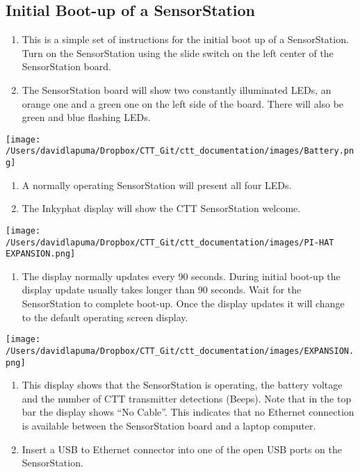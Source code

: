 \documentclass[
]{article}
\providecommand{\tightlist}{%
  \setlength{\itemsep}{0pt}\setlength{\parskip}{0pt}}
\begin{document}
\hypertarget{initial-boot-up-of-a-sensorstation-1}{%
\subsection{Initial Boot-up of a
SensorStation}\label{initial-boot-up-of-a-sensorstation-1}}

\begin{enumerate}
\def\labelenumi{\arabic{enumi}.}
\tightlist
\item
  This is a simple set of instructions for the initial boot up of a
  SensorStation. Turn on the SensorStation using the slide switch on the
  left center of the SensorStation board.
\item
  The SensorStation board will show two constantly illuminated LEDs, an
  orange one and a green one on the left side of the board. There will
  also be green and blue flashing LEDs.
\end{enumerate}

\texttt{[image: /Users/davidlapuma/Dropbox/CTT\_Git/ctt\_documentation/images/Battery.png]}

\begin{enumerate}
\def\labelenumi{\arabic{enumi}.}
\setcounter{enumi}{2}
\tightlist
\item
  A normally operating SensorStation will present all four LEDs.
\item
  The Inkyphat display will show the CTT SensorStation welcome.
\end{enumerate}

\texttt{[image: /Users/davidlapuma/Dropbox/CTT\_Git/ctt\_documentation/images/PI-HAT EXPANSION.png]}

\begin{enumerate}
\def\labelenumi{\arabic{enumi}.}
\setcounter{enumi}{4}
\tightlist
\item
  The display normally updates every 90 seconds. During initial boot-up
  the display update usually takes longer than 90 seconds. Wait for the
  SensorStation to complete boot-up. Once the display updates it will
  change to the default operating screen display.
\end{enumerate}

\texttt{[image: /Users/davidlapuma/Dropbox/CTT\_Git/ctt\_documentation/images/EXPANSION.png]}

\begin{enumerate}
\def\labelenumi{\arabic{enumi}.}
\setcounter{enumi}{5}
\tightlist
\item
  This display shows that the SensorStation is operating, the battery
  voltage and the number of CTT transmitter detections (Beeps). Note
  that in the top bar the display shows ``No Cable''. This indicates
  that no Ethernet connection is available between the SensorStation
  board and a laptop computer.
\item
  Insert a USB to Ethernet connector into one of the open USB ports on
  the SensorStation.
\end{enumerate}
\end{document}
